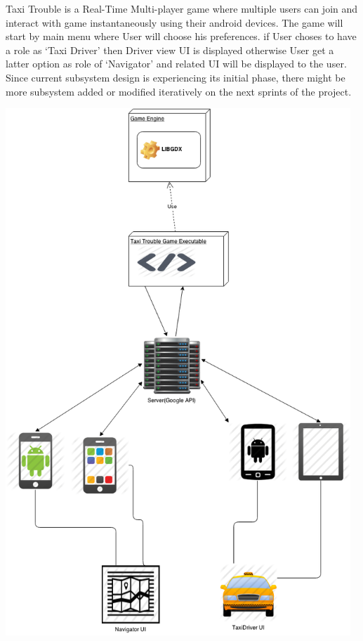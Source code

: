 
Taxi Trouble is a Real-Time Multi-player game where multiple users can join and interact with game instantaneously using their android devices. The game will start by main menu where User will choose his preferences. if User choses to have a role as `Taxi Driver' then Driver view UI is displayed otherwise User get a latter option as role of  `Navigator' and related UI will be displayed to the user. Since current subsystem design is experiencing its initial phase, there might be more subsystem added or modified iteratively on the next sprints of the project.\\


\begin{center}
	 \includegraphics[width=130mm]{./images/hardsoft.png}
\end{center}